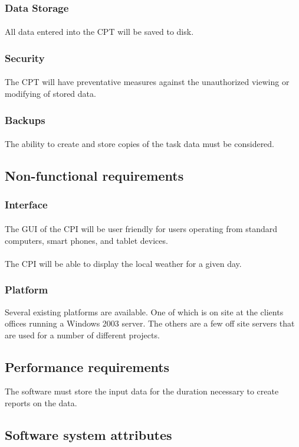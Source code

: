 \documentclass[12pt]{article}
\begin{document}
\subsubsection{Data Storage}\label{sec:Data Storage}
\paragraph{} All data entered into the CPT will be saved to disk.


\subsubsection{Security}\label{sec:Security}
\paragraph{} The CPT will have preventative measures against the unauthorized viewing or modifying of stored data.

\subsubsection{Backups}\label{sec:Backups}
\paragraph{} The ability to create and store copies of the task data must be considered.

\subsection{Non-functional requirements}
\subsubsection{Interface}\label{sec:Interface}
\paragraph{} The GUI of the CPI will be user friendly for users operating from standard computers, smart phones, and tablet devices.
\paragraph{} The CPI will be able to display the local weather for a given day.

\subsubsection{Platform}\label{sec:Platform}
Several existing platforms are available. One of which is on site at the clients offices running a Windows 2003 server. The others are a few off site servers that are used for a number of different projects.

\subsection{Performance requirements}
The software must store the input data for the duration necessary to create reports on the data.

\subsection{Software system attributes}
\end{document}
